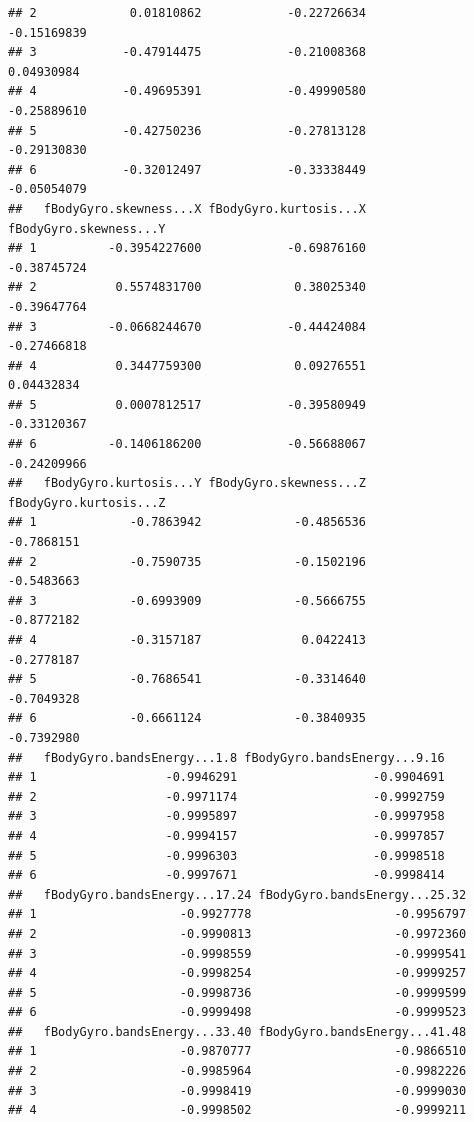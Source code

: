 \documentclass[
]{article}
\begin{document}
\begin{verbatim}
## 2             0.01810862            -0.22726634            -0.15169839
## 3            -0.47914475            -0.21008368             0.04930984
## 4            -0.49695391            -0.49990580            -0.25889610
## 5            -0.42750236            -0.27813128            -0.29130830
## 6            -0.32012497            -0.33338449            -0.05054079
##   fBodyGyro.skewness...X fBodyGyro.kurtosis...X fBodyGyro.skewness...Y
## 1          -0.3954227600            -0.69876160            -0.38745724
## 2           0.5574831700             0.38025340            -0.39647764
## 3          -0.0668244670            -0.44424084            -0.27466818
## 4           0.3447759300             0.09276551             0.04432834
## 5           0.0007812517            -0.39580949            -0.33120367
## 6          -0.1406186200            -0.56688067            -0.24209966
##   fBodyGyro.kurtosis...Y fBodyGyro.skewness...Z fBodyGyro.kurtosis...Z
## 1             -0.7863942             -0.4856536             -0.7868151
## 2             -0.7590735             -0.1502196             -0.5483663
## 3             -0.6993909             -0.5666755             -0.8772182
## 4             -0.3157187              0.0422413             -0.2778187
## 5             -0.7686541             -0.3314640             -0.7049328
## 6             -0.6661124             -0.3840935             -0.7392980
##   fBodyGyro.bandsEnergy...1.8 fBodyGyro.bandsEnergy...9.16
## 1                  -0.9946291                   -0.9904691
## 2                  -0.9971174                   -0.9992759
## 3                  -0.9995897                   -0.9997958
## 4                  -0.9994157                   -0.9997857
## 5                  -0.9996303                   -0.9998518
## 6                  -0.9997671                   -0.9998414
##   fBodyGyro.bandsEnergy...17.24 fBodyGyro.bandsEnergy...25.32
## 1                    -0.9927778                    -0.9956797
## 2                    -0.9990813                    -0.9972360
## 3                    -0.9998559                    -0.9999541
## 4                    -0.9998254                    -0.9999257
## 5                    -0.9998736                    -0.9999599
## 6                    -0.9999498                    -0.9999523
##   fBodyGyro.bandsEnergy...33.40 fBodyGyro.bandsEnergy...41.48
## 1                    -0.9870777                    -0.9866510
## 2                    -0.9985964                    -0.9982226
## 3                    -0.9998419                    -0.9999030
## 4                    -0.9998502                    -0.9999211

\end{verbatim}
\end{document}

